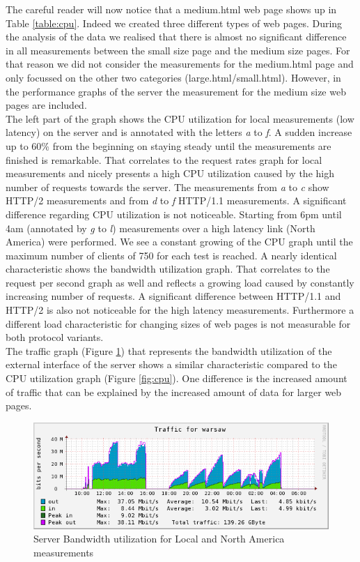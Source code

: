 The careful reader will now  notice that a medium.html web page shows up in Table \ref{table:cpu}. Indeed we created three different types of web pages. During the analysis of the data we realised that there is almost no significant difference in all measurements between the small size page and the medium size pages. For that reason we did not consider the measurements for the medium.html page and only focussed on the other two categories (large.html/small.html). However, in the performance graphs of the server the measurement for the medium size web pages are included.
\\ 
The left part of the graph shows the CPU utilization for local measurements (low latency) on the server and is annotated with the letters \textit{a} to \textit{f}. A sudden increase up to 60\% from the beginning on staying steady until the measurements are finished is remarkable. That correlates to the request rates graph for local measurements and nicely presents a high CPU utilization caused by the high number of requests towards the server. The measurements from \textit{a} to \textit{c} show HTTP/2 measurements and from \textit{d} to \textit{f} HTTP/1.1 measurements. A significant difference regarding CPU utilization is not noticeable. Starting from 6pm until 4am (annotated by \textit{g} to \textit{l}) measurements over a high latency link (North America) were performed. We see a constant growing of the CPU graph until the maximum number of clients of 750 for each test is reached. A nearly identical characteristic shows the bandwidth utilization graph. That correlates to the request per second graph as well and reflects a growing load caused by constantly increasing number of requests. A significant difference between HTTP/1.1 and HTTP/2 is also not noticeable for the high latency measurements. Furthermore a different load characteristic for changing sizes of web pages is not measurable for both protocol variants. 
\\
The traffic graph (Figure \ref{fig:network}) that represents the bandwidth utilization of the external interface of the server shows a similar characteristic compared to the CPU utilization graph (Figure \ref{fig:cpu}). One difference is the increased amount of traffic that can be explained by the increased amount of data for larger web pages. 

\begin{figure}[H]
\centering
\includegraphics[scale=0.6,trim=0.0cm .0cm .0cm .0cm,clip]{images/network.png}
\caption{Server Bandwidth utilization for Local and North America measurements}
\label{fig:network}
\end{figure}

